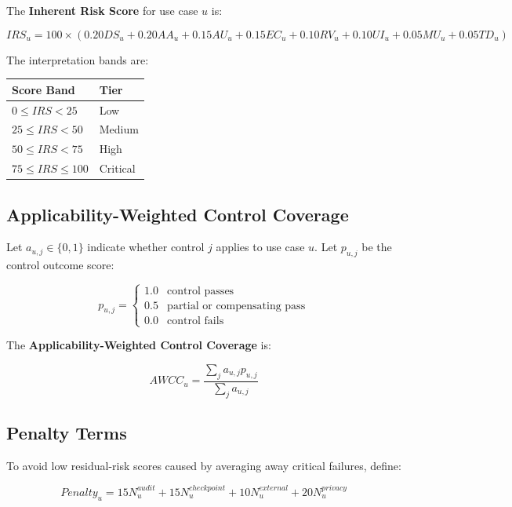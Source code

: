 \documentclass[11pt,a4paper]{article}
\begin{document}
The \textbf{Inherent Risk Score} for use case \(u\) is:

\begin{equation}
IRS_u = 100 \times \left(
0.20DS_u + 0.20AA_u + 0.15AU_u + 0.15EC_u + 0.10RV_u + 0.10UI_u + 0.05MU_u + 0.05TD_u
\right)
\end{equation}

The interpretation bands are:

\begin{center}
\begin{tabular}{ll}
\toprule
\textbf{Score Band} & \textbf{Tier} \\
\midrule
\(0 \le IRS < 25\) & Low \\
\(25 \le IRS < 50\) & Medium \\
\(50 \le IRS < 75\) & High \\
\(75 \le IRS \le 100\) & Critical \\
\bottomrule
\end{tabular}
\end{center}

\subsection{Applicability-Weighted Control Coverage}

Let \(a_{u,j} \in \{0,1\}\) indicate whether control \(j\) applies to use case \(u\). Let \(p_{u,j}\) be the control outcome score:

\[
p_{u,j} =
\begin{cases}
1.0 & \text{control passes} \\
0.5 & \text{partial or compensating pass} \\
0.0 & \text{control fails}
\end{cases}
\]

The \textbf{Applicability-Weighted Control Coverage} is:

\begin{equation}
AWCC_u = \frac{\sum_j a_{u,j}p_{u,j}}{\sum_j a_{u,j}}
\end{equation}

\subsection{Penalty Terms}

To avoid low residual-risk scores caused by averaging away critical failures, define:

\begin{equation}
Penalty_u = 15N^{audit}_u + 15N^{checkpoint}_u + 10N^{external}_u + 20N^{privacy}_u
\end{equation}
\end{document}
